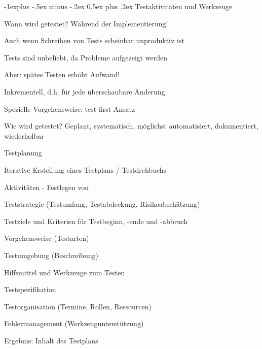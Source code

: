 \documentclass[a4paper]{article}
\makeatletter
\renewcommand{\subsection}{\@startsection{subsection}{2}{0mm}%
                                {-1explus -.5ex minus -.2ex}%
                                {0.5ex plus .2ex}%
                                {\normalfont\normalsize\bfseries}}
\makeatother
\begin{document}
\begin{multicols}{3}
  \subsection{Testaktivitäten und Werkzeuge}
  \begin{itemize*}
    \item Wann wird getestet? Während der Implementierung!
    \begin{itemize*}
      \item Auch wenn Schreiben von Tests scheinbar unproduktiv ist
      \item Tests sind unbeliebt, da Probleme aufgezeigt werden
      \item Aber: spätes Testen erhöht Aufwand!
    \end{itemize*}
    \item Inkrementell, d.h. für jede überschaubare Änderung
    \item Spezielle Vorgehensweise: test first-Ansatz
    \item Wie wird getestet? Geplant, systematisch, möglichst automatisiert, dokumentiert, wiederholbar
  \end{itemize*}

  Testplanung
  \begin{itemize*}
    \item Iterative Erstellung eines Testplans / Testdrehbuchs
    \item Aktivitäten - Festlegen von
    \begin{itemize*}
      \item Teststrategie (Testumfang, Testabdeckung, Risikoabschätzung)
      \item Testziele und Kriterien für Testbeginn, -ende und -abbruch
      \item Vorgehensweise (Testarten)
      \item Testumgebung (Beschreibung)
      \item Hilfsmittel und Werkzeuge zum Testen
      \item Testspezifikation
      \item Testorganisation (Termine, Rollen, Ressourcen)
      \item Fehlermanagement (Werkzeugunterstützung)
    \end{itemize*}
    \item Ergebnis: Inhalt des Testplans
  \end{itemize*}


\end{multicols}
\end{document}
